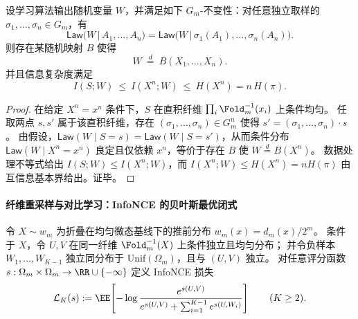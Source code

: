 \begin{proposition}[纤维置换不变性 \texorpdfstring{$\Rightarrow$}{=>} 仅依赖可见变量]\label{prop:op-algebra-fold-gauge-mi-bound}
设学习算法输出随机变量 \(W\)，并满足如下 \(G_m\)-不变性：对任意独立取样的 \(\sigma_1,\dots,\sigma_n\in G_m\)，有
\[
\mathsf{Law}\bigl(W\,\big|\,A_1,\dots,A_n\bigr)
=\mathsf{Law}\bigl(W\,\big|\,\sigma_1(A_1),\dots,\sigma_n(A_n)\bigr).
\]
则存在某随机映射 \(B\) 使得
\[
W\ \stackrel{d}{=}\ B(X_1,\dots,X_n).
\]
并且信息复杂度满足
\[
I(S;W)\ \le\ I(X^n;W)\ \le\ H(X^n)=n\,H(\pi).
\]
\end{proposition}
\begin{proof}
在给定 \(X^n=x^n\) 条件下，\(S\) 在直积纤维 \(\prod_i\Fold_m^{-1}(x_i)\) 上条件均匀。
任取两点 \(s,s'\) 属于该直积纤维，存在 \((\sigma_1,\dots,\sigma_n)\in G_m^n\) 使得 \(s'=(\sigma_1,\dots,\sigma_n)\cdot s\)。
由假设，\(\mathsf{Law}(W\mid S=s)=\mathsf{Law}(W\mid S=s')\)，从而条件分布 \(\mathsf{Law}(W\mid X^n=x^n)\) 良定且仅依赖 \(x^n\)，等价于存在 \(B\) 使 \(W\stackrel d=B(X^n)\)。
数据处理不等式给出 \(I(S;W)\le I(X^n;W)\)，而 \(I(X^n;W)\le H(X^n)=nH(\pi)\) 由互信息基本界给出。证毕。
\end{proof}

\paragraph{纤维重采样与对比学习：InfoNCE 的贝叶斯最优闭式}\label{par:op-algebra-fold-infonce-fiber}
令 \(X\sim w_m\) 为折叠在均匀微态基线下的推前分布
\(
w_m(x)=d_m(x)/2^m
\)。
条件于 \(X\)，令 \(U,V\) 在同一纤维 \(\Fold_m^{-1}(X)\) 上条件独立且均匀分布；
并令负样本 \(W_1,\dots,W_{K-1}\) 独立同分布于 \(\mathrm{Unif}(\Omega_m)\)，且与 \((U,V)\) 独立。
对任意评分函数 \(s:\Omega_m\times\Omega_m\to\RR\cup\{-\infty\}\) 定义 InfoNCE 损失
\[
\mathcal L_K(s):=\EE\!\left[
-\log\frac{e^{s(U,V)}}{e^{s(U,V)}+\sum_{i=1}^{K-1}e^{s(U,W_i)}}
\right]\qquad(K\ge 2).
\]

